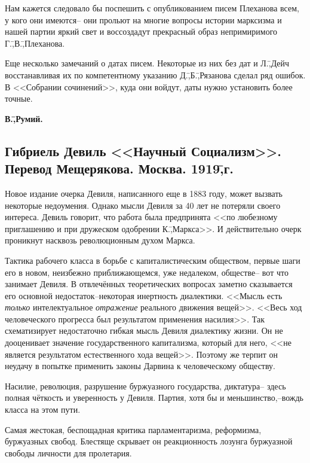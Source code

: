 Нам кажется следовало бы поспешить с опубликованием писем Плеханова всем, у кого они имеются\--- они прольют на многие вопросы истории марксизма и нашей партии яркий свет и воссоздадут прекрасный образ непримиримого Г.\=,В.\=,Плеханова.

Еще несколько замечаний о датах писем. Некоторые из них без дат и Л.\=,Дейч восстанавливая их по компетентному указанию Д.\=,Б.\=,Рязанова сделал ряд ошибок. В <<Собрании сочинений>>, куда они войдут, даты нужно установить более точные.

\begin{flushright}
 \textbf{В.\=,Румий.}\hspace*{2em}
\end{flushright}

\subsection*{Гибриель Девиль <<Научный Социализм>>. Перевод Мещерякова. Москва. 1919\=,г.}
\label{subsec:10.4}

Новое издание очерка Девиля, написанного еще в 1883 году, может вызвать некоторые недоумения. Однако мысли Девиля за 40 лет не потеряли своего интереса. Девиль говорит, что работа была предпринята <<по любезному приглашению и при дружеском одобрении К.\=,Маркса>>. И действительно очерк проникнут насквозь революционным духом Маркса.

Тактика рабочего класса в борьбе с капиталистическим обществом, первые шаги его в новом, неизбежно приближающемся, уже недалеком, обществе\--- вот что занимает Девиля. В отвлечённых теоретических вопросах заметно сказывается его основной недостаток\---некоторая инертность диалектики. <<Мысль есть \emph{только} интелектуальное \emph{отражение} реального движения вещей>>. <<Весь ход человеческого прогресса был результатом применения насилия>>. Так схематизирует недостаточно гибкая мысль Девиля диалектику жизни. Он не дооценивает значение государственного капитализма, который для него, <<не является результатом естественного хода вещей>>. Поэтому же терпит он неудачу в попытке применить законы Дарвина к человеческому обществу.

Насилие, революция, разрушение буржуазного государства, диктатура\--- здесь полная чёткость и уверенность у Девиля. Партия, хотя бы и меньшинство,\---вождь класса на этом пути.

Самая жестокая, беспощадная критика парламентаризма, реформизма, буржуазных свобод. Блестяще скрывает он реакционность лозунга буржуазной свободы личности для пролетария.

